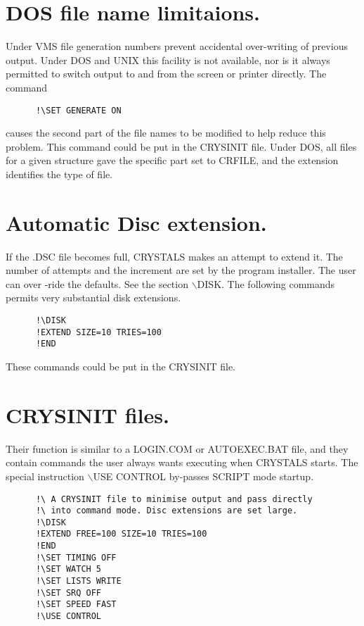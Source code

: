 \documentclass[10pt,a4paper]{report}
\begin{document}
\section{DOS file name limitaions.}


Under VMS file generation numbers prevent accidental over-writing of
 previous output. Under DOS and UNIX this facility is not available, nor
 is it always permitted to switch output to and from the screen or printer
 directly. The command

\small\begin{verbatim}
      !\SET GENERATE ON
\end{verbatim}\normalsize


 causes the second part of the file names to be modified to help reduce this
 problem. This command could be put in the CRYSINIT file.
 Under DOS, all files for a given structure gave the specific part
 set to CRFILE, and the extension identifies the type of file.



\section{Automatic Disc extension.}


If the .DSC file becomes full, CRYSTALS makes an attempt to extend it. The
 number of attempts and the increment are set by the program installer. The
 user can over -ride the defaults. See the section $\backslash$DISK. The
 following commands permits very substantial disk  extensions.

\small\begin{verbatim}
      !\DISK
      !EXTEND SIZE=10 TRIES=100
      !END
\end{verbatim}\normalsize


 These commands could be put in the CRYSINIT file.



\section{CRYSINIT files.}


Their function is similar to a LOGIN.COM or AUTOEXEC.BAT file, and they
 contain commands the user
 always wants executing when CRYSTALS starts. The special instruction
 $\backslash$USE CONTROL by-passes SCRIPT mode startup.


\small\begin{verbatim}
      !\ A CRYSINIT file to minimise output and pass directly
      !\ into command mode. Disc extensions are set large.
      !\DISK
      !EXTEND FREE=100 SIZE=10 TRIES=100
      !END
      !\SET TIMING OFF
      !\SET WATCH 5
      !\SET LISTS WRITE
      !\SET SRQ OFF
      !\SET SPEED FAST
      !\USE CONTROL
\end{verbatim}\normalsize
\end{document}
